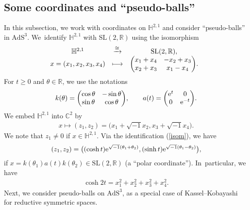 \documentclass[10pt,a4paper]{amsart}
\numberwithin{equation}{section}
\begin{document}
\subsection{Some coordinates and ``pseudo-balls''}
In this subsection, we work with coordinates on $\mathbb{H}^{2,1}$ and
consider ``pseudo-balls'' in $\mathrm{AdS}^{3}$. We~identify
$\mathbb{H}^{2,1}$ with $\mathrm{SL}(2,\mathbb{R})$ using the isomorphism
\begin{align}
\begin{array}{@{}ccc}
\mathbb{H}^{2,1} & \xrightarrow{\cong} & \mathrm{SL}(2,\mathbb{R}), \\
x=(x_1,x_2,x_3,x_4) & \longmapsto & \begin{pmatrix}
x_1 + x_4 & -x_2 + x_3 \\
x_2 + x_3 & x_1 -x_4
\end{pmatrix}\!.\label{isom}
\end{array}
\end{align}
For $t\geq0$ and $\theta\in\mathbb{R}$, we use the notations
\begin{gather}
\label{k-a}
k(\theta) = \begin{pmatrix}
\cos\theta & -\sin\theta \\
\sin\theta & \cos\theta
\end{pmatrix}\!,\qquad
a(t) = \begin{pmatrix}
{\rm e}^t & 0 \\
0 & {\rm e}^{-t}
\end{pmatrix}\!.
\end{gather}
We embed $\mathbb{H}^{2,1}$ into $\mathbb{C}^{2}$ by
\begin{gather}
\label{embed}
x\mapsto (z_1,z_2) = \big(x_1 + \sqrt{-1}x_2, x_3 + \sqrt{-1}x_4\big).
\end{gather}
We note that $z_{1}\neq0$ if $x\in\mathbb{H}^{2,1}$.
Via the identification (\ref{isom}), we have
\begin{gather}
\label{polar}
(z_1,z_2) = \big((\cosh t){\rm e}^{\sqrt{-1}(\theta_1+\theta_2)},
(\sinh t){\rm e}^{\sqrt{-1}(\theta_1-\theta_2)}\big),
\end{gather}
if $x = k(\theta_1)a(t)k(\theta_2) \in \mathrm{SL}(2,\mathbb{R})$
(a ``polar coordinate''). In~particular, we have
\begin{gather*}
\cosh 2t = x_1^2 + x_2^2 + x_3^2 + x_4^2.
\end{gather*}
Next, we consider pseudo-balls on $\mathrm{AdS}^3$, as a special case of
Kassel--Kobayashi~\cite{KaKob16} for
reductive symmetric spaces.
\end{document}
